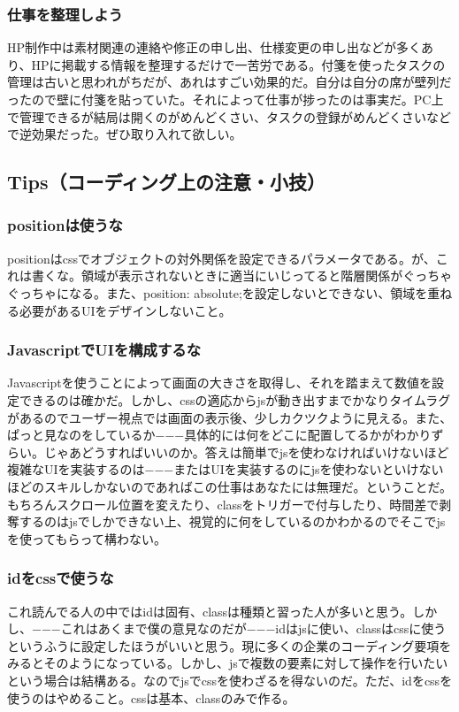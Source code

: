 \documentclass[dvipdfmx,jb5]{jarticle}
\begin{document}
 \subsubsection{仕事を整理しよう}
 HP制作中は素材関連の連絡や修正の申し出、仕様変更の申し出などが多くあり、HPに掲載する情報を整理するだけで一苦労である。付箋を使ったタスクの管理は古いと思われがちだが、あれはすごい効果的だ。自分は自分の席が壁列だったので壁に付箋を貼っていた。それによって仕事が捗ったのは事実だ。PC上で管理できるが結局は開くのがめんどくさい、タスクの登録がめんどくさいなどで逆効果だった。ぜひ取り入れて欲しい。
 \subsection{Tips（コーディング上の注意・小技）}
 \subsubsection{positionは使うな}
 positionはcssでオブジェクトの対外関係を設定できるパラメータである。が、これは書くな。領域が表示されないときに適当にいじってると階層関係がぐっちゃぐっちゃになる。また、position: absolute;を設定しないとできない、領域を重ねる必要があるUIをデザインしないこと。


 \subsubsection{JavascriptでUIを構成するな}
 Javascriptを使うことによって画面の大きさを取得し、それを踏まえて数値を設定できるのは確かだ。しかし、cssの適応からjsが動き出すまでかなりタイムラグがあるのでユーザー視点では画面の表示後、少しカクツクように見える。また、ぱっと見なのをしているか−−−具体的には何をどこに配置してるかがわかりずらい。じゃあどうすればいいのか。答えは簡単でjsを使わなければいけないほど複雑なUIを実装するのは−−−またはUIを実装するのにjsを使わないといけないほどのスキルしかないのであればこの仕事はあなたには無理だ。ということだ。もちろんスクロール位置を変えたり、classをトリガーで付与したり、時間差で剥奪するのはjsでしかできない上、視覚的に何をしているのかわかるのでそこでjsを使ってもらって構わない。

\subsubsection{idをcssで使うな}
これ読んでる人の中ではidは固有、classは種類と習った人が多いと思う。しかし、−−−これはあくまで僕の意見なのだが−−−idはjsに使い、classはcssに使うというふうに設定したほうがいいと思う。現に多くの企業のコーディング要項をみるとそのようになっている。しかし、jsで複数の要素に対して操作を行いたいという場合は結構ある。なのでjsでcssを使わざるを得ないのだ。ただ、idをcssを使うのはやめること。cssは基本、classのみで作る。
\end{document}
